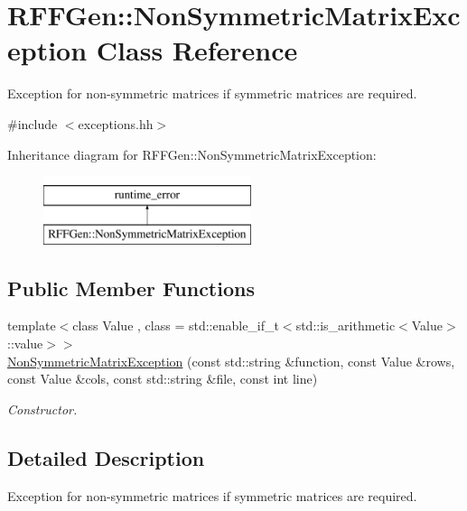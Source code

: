 \hypertarget{classRFFGen_1_1NonSymmetricMatrixException}{\section{R\-F\-F\-Gen\-:\-:Non\-Symmetric\-Matrix\-Exception Class Reference}
\label{classRFFGen_1_1NonSymmetricMatrixException}
}


Exception for non-\/symmetric matrices if symmetric matrices are required.  




{\ttfamily \#include $<$exceptions.\-hh$>$}

Inheritance diagram for R\-F\-F\-Gen\-:\-:Non\-Symmetric\-Matrix\-Exception\-:\begin{figure}[H]
\begin{center}
\leavevmode
\includegraphics[height=2.000000cm]{classRFFGen_1_1NonSymmetricMatrixException}
\end{center}
\end{figure}
\subsection*{Public Member Functions}
\begin{DoxyCompactItemize}
\item 
{\footnotesize template$<$class Value , class  = std\-::enable\-\_\-if\-\_\-t$<$std\-::is\-\_\-arithmetic$<$\-Value$>$\-::value$>$$>$ }\\\hyperlink{classRFFGen_1_1NonSymmetricMatrixException_ae920b81f42489271406f48b6dc8aeaa1}{Non\-Symmetric\-Matrix\-Exception} (const std\-::string \&function, const Value \&rows, const Value \&cols, const std\-::string \&file, const int line)
\begin{DoxyCompactList}\small\item\em Constructor. \end{DoxyCompactList}\end{DoxyCompactItemize}


\subsection{Detailed Description}
Exception for non-\/symmetric matrices if symmetric matrices are required. 

